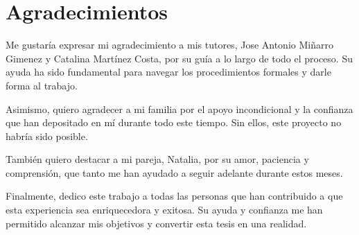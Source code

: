 



\cleardoublepage %

\chapter*{Agradecimientos
}

\thispagestyle{empty}
\vspace{1cm}

Me gustaría expresar mi agradecimiento a mis tutores, Jose Antonio Miñarro Gimenez y Catalina Martínez Costa, por su guía a lo largo de todo el proceso. Su ayuda ha sido fundamental para navegar los procedimientos formales y darle forma al trabajo.\bigskip

Asimismo, quiero agradecer a mi familia por el apoyo incondicional y la confianza que han depositado en mí durante todo este tiempo. Sin ellos, este proyecto no habría sido posible.


También quiero destacar a mi pareja, Natalia, por su amor, paciencia y comprensión, que tanto me han ayudado a seguir adelante durante estos meses.\bigskip

Finalmente, dedico este trabajo a todas las personas que han contribuido a que esta experiencia sea enriquecedora y exitosa. Su ayuda y confianza me han permitido alcanzar
mis objetivos y convertir esta tesis en una realidad.

\cleardoublepage %




